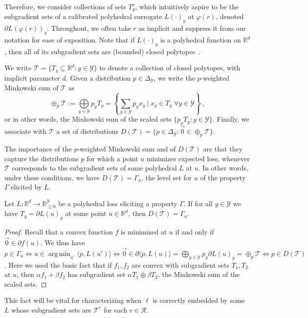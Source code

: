 \documentclass[anon]{colt2020} %
\newcommand{\reals}{\mathbb{R}}
\newcommand{\nonnegreals}{\reals_{\geq 0}}%
\newcommand{\simplex}{\Delta_\Y}
\newcommand{\R}{\mathcal{R}}
\newcommand{\T}{\mathcal{T}}
\newcommand{\Y}{\mathcal{Y}}
\newcommand{\inprod}[2]{\langle #1, #2 \rangle}%
\DeclareMathOperator*{\argmin}{arg\,min}
\begin{document}
Therefore, we consider collections of sets $T^r_y$, which intuitively aspire to be the subgradient sets of a calibrated polyhedral surrogate $L(\cdot)_y$ at $\varphi(r)$, denoted $\partial L(\varphi(r))_y$.
Throughout, we often take $r$ as implicit and suppress it from our notation for ease of exposition.
Note that if $L(\cdot)_y$ is a polyhedral function on $\reals^d$, then all of its subgradient sets are (bounded) closed polytopes~\citep{rockafellar1997convex}.

\begin{definition}[$\T$, $D(\T)$]
  We write $\T = \{T_y \subseteq \reals^d : y \in \Y\}$ to denote a collection of closed polytopes, with implicit parameter $d$.
  Given a distribution $p \in \simplex$, we write the $p$-weighted Minkowski sum of $\T$ as
  \begin{equation*}
    \oplus_p \T := \mathop{\bigoplus}\limits_{y\in\Y} p_yT_y = \left\{ \sum_{y \in \Y} p_y x_y ~\Big|~ x_y \in T_y \; \forall y\in\Y \right\}~,
  \end{equation*}
  or in other words, the Minkowski sum of the scaled sets $\{p_y T_y : y \in \Y\}$.
  Finally, we associate with $\T$ a set of distributions $D(\T) = \{ p \in \simplex : \vec 0 \in \oplus_p \T\}$.
\end{definition}

The importance of the $p$-weighted Minkowski sum and of $D(\T)$ are that they capture the distributions $p$ for which a point $u$ minimizes expected loss, whenever $\T$ corresponds to the subgradient sets of some polyhedral $L$ at $u$.
In other words, under these conditions, we have $D(\T) = \Gamma_u$, the level set for $u$ of the property $\Gamma$ elicited by $L$.
\begin{lemma} \label{lem:minkowski-0-opt}
  Let $L: \reals^d \to \nonnegreals^{\Y}$ be a polyhedral loss eliciting a property $\Gamma$.
  If for all $y\in\Y$ we have $T_y = \partial L(u)_y$ at some point $u\in\reals^d$, then $D(\T) = \Gamma_u$.
\end{lemma}
\begin{proof}
  Recall that a convex function $f$ is minimized at $u$ if and only if $\vec 0 \in \partial f(u)$.
  We thus have $p\in\Gamma_u \iff u \in \argmin_{u'} \inprod{p}{L(u')} \iff \vec 0 \in \partial\inprod{p}{L(u)} = \mathop{\bigoplus}_{y\in\Y} p_y \partial L(u)_y = \oplus_p \T \iff p\in D(\T)$.
  Here we used the basic fact that if $f_1,f_2$ are convex with subgradient sets $T_1,T_2$ at $u$, then $\alpha f_1 + \beta f_2$ has subgradient set $\alpha T_1 \oplus \beta T_2$, the Minkowski sum of the scaled sets.
\end{proof}
This fact will be vital for characterizing when $\ell$ is correctly embedded by some $L$ whose subgradient sets are $\T^r$ for each $r \in \R$.
\end{document}
